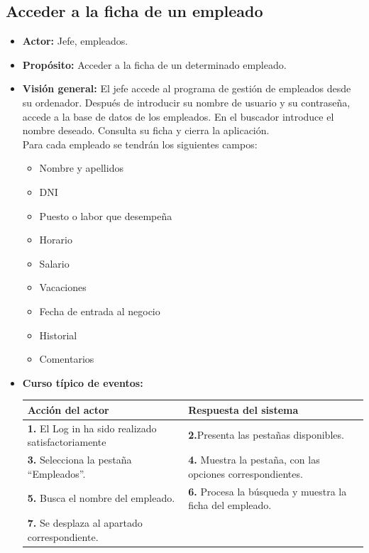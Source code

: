 \documentclass[spanish,a4paper,12pt]{report}	%
\begin{document}
		

	\subsection{Acceder a la ficha de un empleado}		
			\begin{itemize}
			\item \textbf{Actor:} Jefe, empleados.
			\item \textbf{Propósito: } Acceder a la ficha de un determinado empleado.
			\item \textbf{Visión general:} El jefe accede al programa de gestión de empleados desde su ordenador. Después de introducir su nombre de usuario y su contraseña, accede a la base de datos de los empleados. En el buscador introduce el nombre deseado. Consulta su ficha y cierra la aplicación. \\
Para cada empleado se tendrán los siguientes campos:
				\begin{itemize}
				\item 	 Nombre y apellidos
				\item 	 DNI
				\item 	 Puesto o labor que desempeña
				\item 	 Horario
				\item 	 Salario
				\item 	 Vacaciones
				\item 	 Fecha de entrada al negocio
				\item 	 Historial
				\item 	 Comentarios
				\end {itemize}
			\item \textbf{Curso típico de eventos:} 	\\
				\begin{tabular}{|p{6cm}||p{6cm}|}
				\hline
				\textbf{Acción del actor} & \textbf{Respuesta del sistema} \\ \hline \hline
				\textbf{1.} El Log in ha sido realizado satisfactoriamente & \textbf{2.}Presenta las pestañas disponibles.\\ \hline 
				\textbf{3.} Selecciona la pestaña “Empleados”. & \textbf{4.} Muestra la pestaña, con las opciones correspondientes. \\ \hline
				\textbf{5.} Busca el nombre del empleado.	& \textbf{6.} Procesa la búsqueda y muestra la ficha del empleado. \\ \hline
				\textbf{7.} Se desplaza al apartado correspondiente.  & \textbf{} \\ \hline

\end{tabular}
\end{itemize}
\end{document}
